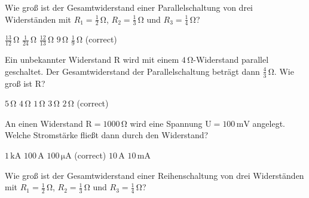 \documentclass[11pt]{exam}
\begin{document}
\setlength{\voffset}{-0.5in}
\setlength{\headsep}{5pt}

\hspace{2mm}
 \hspace{5mm}
\vspace{4mm}

\begin{questions}

\question Wie groß ist der Gesamtwiderstand einer Parallelschaltung von drei Widerständen mit \(R_1=\mathrm{\frac{1}{2}\,\Omega}\), \(R_2=\mathrm{\frac{1}{3}\,\Omega}\) und \(R_3=\mathrm{\frac{1}{4}\,\Omega}\)?

\begin{choices}
	\choice \(\mathrm{\frac{13}{12}\,\Omega}\)
	\choice \(\mathrm{\frac{1}{24}\,\Omega}\)
	\choice \(\mathrm{\frac{12}{13}\,\Omega}\)
	\choice \(\mathrm{9\,\Omega}\)
	\choice \(\mathrm{\frac{1}{9}\,\Omega}\) (correct)
\end{choices}

\vspace{3mm}\question Ein unbekannter Widerstand \(\mathrm{R}\) wird mit einem \(\mathrm{4\,\Omega}\)-Widerstand parallel geschaltet. Der Gesamtwiderstand der Parallelschaltung beträgt dann \(\mathrm{\frac{4}{3}\,\Omega}\). Wie groß ist \(\mathrm{R}\)?

\begin{choices}
	\choice \(\mathrm{5\,\Omega}\)
	\choice \(\mathrm{4\,\Omega}\)
	\choice \(\mathrm{1\,\Omega}\)
	\choice \(\mathrm{3\,\Omega}\)
	\choice \(\mathrm{2\,\Omega}\) (correct)
\end{choices}

\vspace{3mm}\question An einen Widerstand \(\mathrm{R=1000\,\Omega}\) wird eine Spannung \(\mathrm{U=100\,mV}\) angelegt. Welche Stromstärke fließt dann durch den Widerstand?

\begin{choices}
	\choice \(\mathrm{1\,kA}\)
	\choice \(\mathrm{100\,A}\)
	\choice \(\mathrm{100\,\mu A}\) (correct)
	\choice \(\mathrm{10\,A}\)
	\choice \(\mathrm{10\,mA}\)
\end{choices}

\vspace{3mm}\question Wie groß ist der Gesamtwiderstand einer Reihenschaltung von drei Widerständen mit \(R_1=\mathrm{\frac{1}{2}\,\Omega}\), \(R_2=\mathrm{\frac{1}{3}\,\Omega}\) und \(R_3=\mathrm{\frac{1}{4}\,\Omega}\)?


\end{questions}
\end{document}
